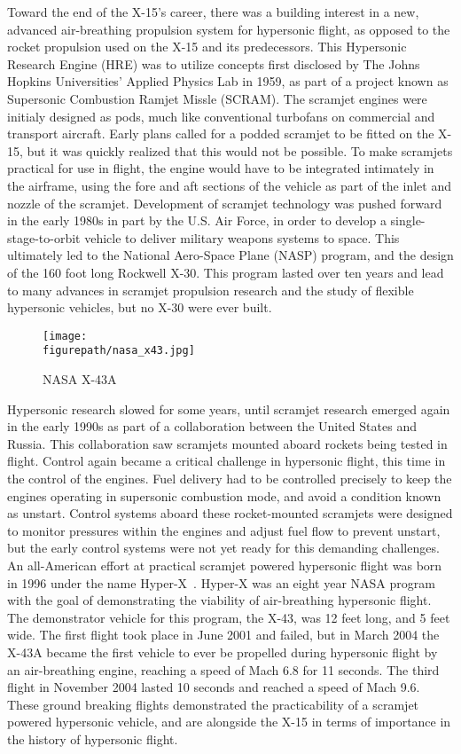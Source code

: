 Toward the end of the X-15's career, there was a building interest in a new, advanced air-breathing propulsion system for hypersonic flight, as opposed to the rocket propulsion used on the X-15 and its predecessors.
This Hypersonic Research Engine (HRE) was to utilize concepts first disclosed by The Johns Hopkins Universities' Applied Physics Lab in 1959, as part of a project known as Supersonic Combustion Ramjet Missle (SCRAM).
The scramjet engines were initialy designed as pods, much like conventional turbofans on commercial and transport aircraft.
Early plans called for a podded scramjet to be fitted on the X-15, but it was quickly realized that this would not be possible.
To make scramjets practical for use in flight, the engine would have to be integrated intimately in the airframe, using the fore and aft sections of the vehicle as part of the inlet and nozzle of the scramjet.
Development of scramjet technology was pushed forward in the early 1980s in part by the U.S. Air Force, in order to develop a single-stage-to-orbit vehicle to deliver military weapons systems to space.
This ultimately led to the National Aero-Space Plane (NASP) program, and the design of the 160 foot long Rockwell X-30.
This program lasted over ten years and lead to many advances in scramjet propulsion research and the study of flexible hypersonic vehicles, but no X-30 were ever built.

\begin{figure}[h]
  \begin{center}
    \texttt{[image: \\figurepath/nasa\_x43.jpg]}
    \caption{NASA X-43A}
  \end{center}
\end{figure}

Hypersonic research slowed for some years, until scramjet research emerged again in the early 1990s as part of a collaboration between the United States and Russia.
This collaboration saw scramjets mounted aboard rockets being tested in flight.
Control again became a critical challenge in hypersonic flight, this time in the control of the engines.
Fuel delivery had to be controlled precisely to keep the engines operating in supersonic combustion mode, and avoid a condition known as unstart.
Control systems aboard these rocket-mounted scramjets were designed to monitor pressures within the engines and adjust fuel flow to prevent unstart, but the early control systems were not yet ready for this demanding challenges.
An all-American effort at practical scramjet powered hypersonic flight was born in 1996 under the name Hyper-X\ \cite{freeman.hyperx.1997}.
Hyper-X was an eight year NASA program with the goal of demonstrating the viability of air-breathing hypersonic flight.
The demonstrator vehicle for this program, the X-43, was 12 feet long, and 5 feet wide.
The first flight took place in June 2001 and failed, but in March 2004 the X-43A became the first vehicle to ever be propelled during hypersonic flight by an air-breathing engine, reaching a speed of Mach 6.8 for 11 seconds.
The third flight in November 2004 lasted 10 seconds and reached a speed of Mach 9.6.
These ground breaking flights demonstrated the practicability of a scramjet powered hypersonic vehicle, and are alongside the X-15 in terms of importance in the history of hypersonic flight.

